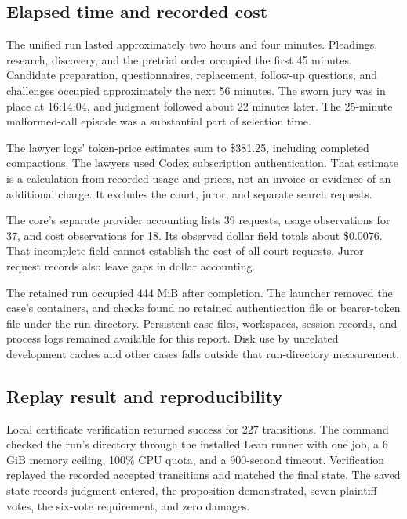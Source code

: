 \subsection{Elapsed time and recorded cost}

The unified run lasted approximately two hours and four minutes.  Pleadings, research, discovery, and the pretrial order occupied the first 45 minutes.  Candidate preparation, questionnaires, replacement, follow-up questions, and challenges occupied approximately the next 56 minutes.  The sworn jury was in place at 16:14:04, and judgment followed about 22 minutes later.  The 25-minute malformed-call episode was a substantial part of selection time.

The lawyer logs' token-price estimates sum to \$381.25, including completed compactions.  The lawyers used Codex subscription authentication.  That estimate is a calculation from recorded usage and prices, not an invoice or evidence of an additional charge.  It excludes the court, juror, and separate search requests.

The core's separate provider accounting lists 39 requests, usage observations for 37, and cost observations for 18.  Its observed dollar field totals about \$0.0076.  That incomplete field cannot establish the cost of all court requests.  Juror request records also leave gaps in dollar accounting.

The retained run occupied 444 MiB after completion.  The launcher removed the case's containers, and checks found no retained authentication file or bearer-token file under the run directory.  Persistent case files, workspaces, session records, and process logs remained available for this report.  Disk use by unrelated development caches and other cases falls outside that run-directory measurement.

\subsection{Replay result and reproducibility}

Local certificate verification returned success for 227 transitions.  The  command checked the run's  directory through the installed Lean runner with one job, a 6 GiB memory ceiling, 100\% CPU quota, and a 900-second timeout.  Verification replayed the recorded accepted transitions and matched the final state.  The saved state records judgment entered, the proposition demonstrated, seven plaintiff votes, the six-vote requirement, and zero damages.

